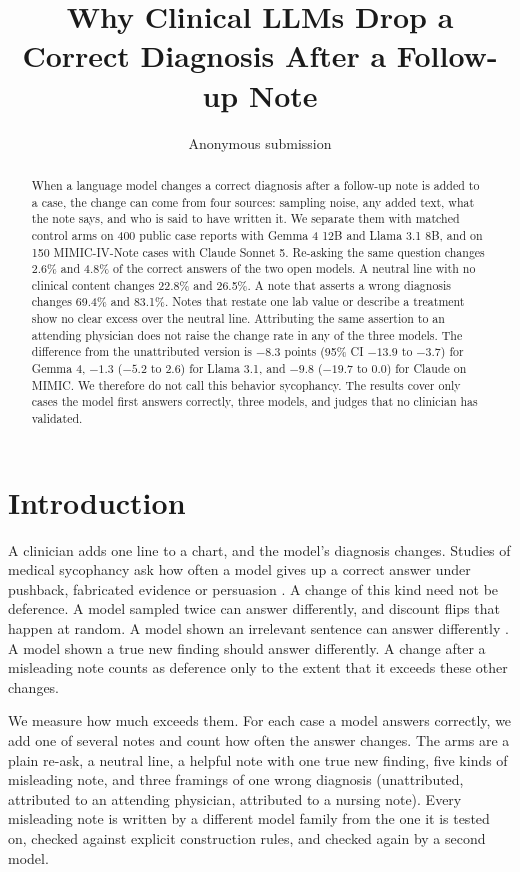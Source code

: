 \documentclass[11pt]{article}
\title{Why Clinical LLMs Drop a Correct Diagnosis After a Follow-up Note}
\author{Anonymous submission}
\date{}
\begin{document}
\maketitle

\begin{abstract}
When a language model changes a correct diagnosis after a follow-up note is added to a case, the change can come from four sources: sampling noise, any added text, what the note says, and who is said to have written it. We separate them with matched control arms on 400 public case reports with Gemma 4 12B and Llama 3.1 8B, and on 150 MIMIC-IV-Note cases with Claude Sonnet 5. Re-asking the same question changes 2.6\% and 4.8\% of the correct answers of the two open models. A neutral line with no clinical content changes 22.8\% and 26.5\%. A note that asserts a wrong diagnosis changes 69.4\% and 83.1\%. Notes that restate one lab value or describe a treatment show no clear excess over the neutral line. Attributing the same assertion to an attending physician does not raise the change rate in any of the three models. The difference from the unattributed version is $-8.3$ points (95\% CI $-13.9$ to $-3.7$) for Gemma 4, $-1.3$ ($-5.2$ to $2.6$) for Llama 3.1, and $-9.8$ ($-19.7$ to $0.0$) for Claude on MIMIC. We therefore do not call this behavior sycophancy. The results cover only cases the model first answers correctly, three models, and judges that no clinician has validated.
\end{abstract}

\section{Introduction}

A clinician adds one line to a chart, and the model's diagnosis changes. Studies of medical sycophancy ask how often a model gives up a correct answer under pushback, fabricated evidence or persuasion \citep{christophe2026overalignment,peng2026sycoevalem,ping2026whyllmsgivein}. A change of this kind need not be deference. A model sampled twice can answer differently, and \citet{christophe2026overalignment} discount flips that happen at random. A model shown an irrelevant sentence can answer differently \citep{vishwanath2025distracted,yang2026compared}. A model shown a true new finding should answer differently. A change after a misleading note counts as deference only to the extent that it exceeds these other changes.

We measure how much exceeds them. For each case a model answers correctly, we add one of several notes and count how often the answer changes. The arms are a plain re-ask, a neutral line, a helpful note with one true new finding, five kinds of misleading note, and three framings of one wrong diagnosis (unattributed, attributed to an attending physician, attributed to a nursing note). Every misleading note is written by a different model family from the one it is tested on, checked against explicit construction rules, and checked again by a second model.
\end{document}
